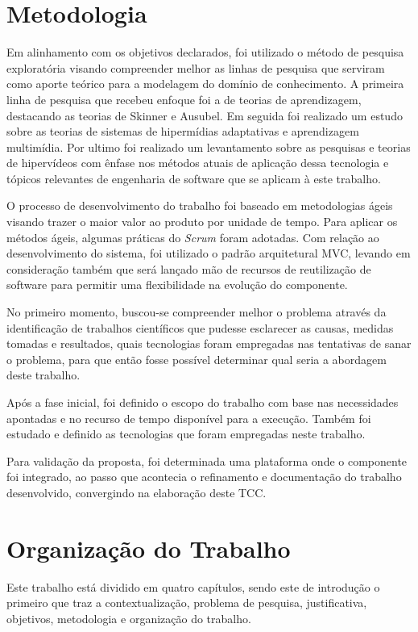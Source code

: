 \section{Metodologia}

Em alinhamento com os objetivos declarados, foi utilizado o método de pesquisa exploratória visando compreender melhor as linhas de pesquisa que serviram como aporte teórico para a modelagem do domínio de conhecimento. A primeira linha de pesquisa que recebeu enfoque foi a de teorias de aprendizagem, destacando as teorias de Skinner e Ausubel. Em seguida foi realizado um estudo sobre as teorias de sistemas de hipermídias adaptativas e aprendizagem multimídia. Por ultimo foi realizado um levantamento sobre as pesquisas e teorias de hipervídeos com ênfase nos métodos atuais de aplicação dessa tecnologia e tópicos relevantes de engenharia de software que se aplicam à este trabalho.

O processo de desenvolvimento do trabalho foi baseado em metodologias ágeis visando trazer o maior valor ao produto por unidade de tempo. Para aplicar os métodos ágeis, algumas práticas do \textit{Scrum} foram adotadas. Com relação ao desenvolvimento do sistema, foi utilizado o padrão arquitetural MVC, levando em consideração também que será lançado mão de recursos de reutilização de software para permitir uma flexibilidade na evolução do componente.

No primeiro momento, buscou-se compreender melhor o problema através da identificação de trabalhos científicos que pudesse esclarecer as causas, medidas tomadas e resultados, quais tecnologias foram empregadas nas tentativas de sanar o problema, para que então fosse possível determinar qual seria a abordagem deste trabalho.

Após a fase inicial, foi definido o escopo do trabalho com base nas necessidades apontadas e no recurso de tempo disponível para a execução. Também foi estudado e definido as tecnologias que foram empregadas neste trabalho.

Para validação da proposta, foi determinada uma plataforma onde o componente foi integrado, ao passo que acontecia o refinamento e documentação do trabalho desenvolvido, convergindo na elaboração deste TCC.

\section{Organização do Trabalho}

Este trabalho está dividido em quatro capítulos, sendo este de introdução o primeiro que traz a contextualização, problema de pesquisa, justificativa, objetivos, metodologia e organização do trabalho.

